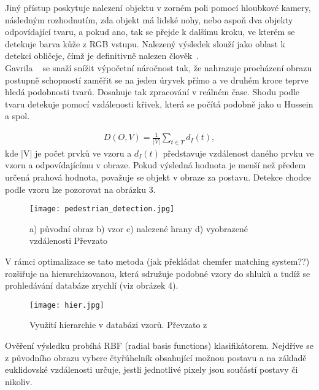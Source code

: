 Jiný přístup poskytuje nalezení objektu v zorném poli pomocí hloubkové kamery, následným rozhodnutím, zda objekt má lidské nohy, nebo aspoň dva objekty odpovídající tvaru, a pokud ano, tak se přejde k dalšímu kroku, ve kterém se detekuje barva kůže z RGB vstupu. Nalezený výsledek slouží jako oblast k detekci obličeje, čímž je definitivně nalezen člověk~\cite{10}.\\

Gavrila ~\cite{7} se snaží snížit výpočetní náročnost tak, že nahrazuje procházení obrazu postupně schopností zaměřit se na jeden úryvek přímo a ve druhém kroce teprve hledá podobnosti tvarů. Dosahuje tak zpracování v reálném čase.
Shodu podle tvaru detekuje pomocí vzdálenosti křivek, která se počítá podobně jako u Hussein a spol.~\cite{9} 

\begin{eqnarray}
 D(O,V) = \frac{1}{|V|}\sum_{t\in T}^{}d_{I}(t) ,
\end{eqnarray}
kde |V| je počet prvků ve vzoru a $ d_{I}(t) $ představuje vzdálenost daného prvku ve vzoru a odpovídajícímu v obraze. Pokud výsledná hodnota je menší než předem určená prahová hodnota, považuje se objekt v obraze za postavu. Detekce chodce podle vzoru lze pozorovat na obrázku 3. \\
\newpage
\begin{figure}[h]
\centering
\texttt{[image: pedestrian\_detection.jpg]}
\caption{a) původní obraz b) vzor c) nalezené hrany d) vyobrazené vzdálenosti
Převzato ~\cite{7} }
\end{figure}
V rámci optimalizace se tato metoda (jak překládat chemfer matching system??) rozšiřuje na hierarchizovanou, která sdružuje podobné vzory do shluků a tudíž se prohledávání databáze zrychlí (viz obrázek 4).
\begin{figure}[h]
\centering
\texttt{[image: hier.jpg]}
\caption{Využití hierarchie v databázi vzorů. Převzato z ~\cite{7} }
\end{figure}
\newpage

Ověření výsledku probíhá RBF (radial basis functions) klasifikátorem. Nejdříve se z původního obrazu vybere čtyřúhelník obsahující možnou postavu a na základě euklidovské vzdálenosti určuje, jestli jednotlivé pixely jsou součástí postavy či nikoliv.\\

